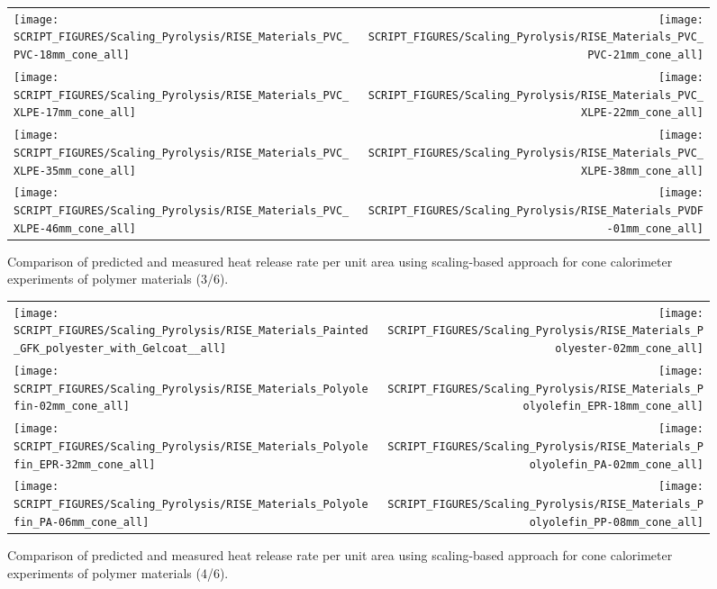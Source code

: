 \begin{figure}[!h]
\begin{tabular*}{\textwidth}{l@{\extracolsep{\fill}}r}
\texttt{[image: SCRIPT\_FIGURES/Scaling\_Pyrolysis/RISE\_Materials\_PVC\_PVC-18mm\_cone\_all]} &
\texttt{[image: SCRIPT\_FIGURES/Scaling\_Pyrolysis/RISE\_Materials\_PVC\_PVC-21mm\_cone\_all]} \\
\texttt{[image: SCRIPT\_FIGURES/Scaling\_Pyrolysis/RISE\_Materials\_PVC\_XLPE-17mm\_cone\_all]} &
\texttt{[image: SCRIPT\_FIGURES/Scaling\_Pyrolysis/RISE\_Materials\_PVC\_XLPE-22mm\_cone\_all]} \\
\texttt{[image: SCRIPT\_FIGURES/Scaling\_Pyrolysis/RISE\_Materials\_PVC\_XLPE-35mm\_cone\_all]} &
\texttt{[image: SCRIPT\_FIGURES/Scaling\_Pyrolysis/RISE\_Materials\_PVC\_XLPE-38mm\_cone\_all]} \\
\texttt{[image: SCRIPT\_FIGURES/Scaling\_Pyrolysis/RISE\_Materials\_PVC\_XLPE-46mm\_cone\_all]} &
\texttt{[image: SCRIPT\_FIGURES/Scaling\_Pyrolysis/RISE\_Materials\_PVDF-01mm\_cone\_all]} \\
\end{tabular*}
\caption[HRRPUA of RISE materials using scaling model, polymer materials]
{Comparison of predicted and measured heat release rate per unit area using scaling-based approach for cone calorimeter experiments of polymer materials (3/6).}
\label{RISE_Materials_polymers3}
\end{figure}

\begin{figure}[!h]
\begin{tabular*}{\textwidth}{l@{\extracolsep{\fill}}r}
\texttt{[image: SCRIPT\_FIGURES/Scaling\_Pyrolysis/RISE\_Materials\_Painted\_GFK\_polyester\_with\_Gelcoat\_\_all]} &
\texttt{[image: SCRIPT\_FIGURES/Scaling\_Pyrolysis/RISE\_Materials\_Polyester-02mm\_cone\_all]} \\
\texttt{[image: SCRIPT\_FIGURES/Scaling\_Pyrolysis/RISE\_Materials\_Polyolefin-02mm\_cone\_all]} &
\texttt{[image: SCRIPT\_FIGURES/Scaling\_Pyrolysis/RISE\_Materials\_Polyolefin\_EPR-18mm\_cone\_all]} \\
\texttt{[image: SCRIPT\_FIGURES/Scaling\_Pyrolysis/RISE\_Materials\_Polyolefin\_EPR-32mm\_cone\_all]} &
\texttt{[image: SCRIPT\_FIGURES/Scaling\_Pyrolysis/RISE\_Materials\_Polyolefin\_PA-02mm\_cone\_all]} \\
\texttt{[image: SCRIPT\_FIGURES/Scaling\_Pyrolysis/RISE\_Materials\_Polyolefin\_PA-06mm\_cone\_all]} &
\texttt{[image: SCRIPT\_FIGURES/Scaling\_Pyrolysis/RISE\_Materials\_Polyolefin\_PP-08mm\_cone\_all]} \\
\end{tabular*}
\caption[HRRPUA of RISE materials using scaling model, polymer materials]
{Comparison of predicted and measured heat release rate per unit area using scaling-based approach for cone calorimeter experiments of polymer materials (4/6).}
\label{RISE_Materials_polymers4}
\end{figure}

